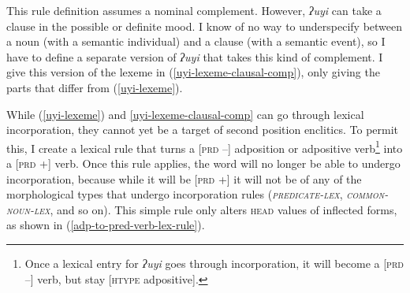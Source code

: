 This rule definition assumes a nominal complement. However, \textit{ʔuyi} can take a clause in the possible or definite mood. I know of no way to underspecify between a noun (with a semantic individual) and a clause (with a semantic event), so I have to define a separate version of \textit{ʔuyi} that takes this kind of complement. I give this version of the lexeme in (\ref{uyi-lexeme-clausal-comp}), only giving the parts that differ from (\ref{uyi-lexeme}).

\ex \label{uyi-lexeme-clausal-comp}
\xe

While (\ref{uyi-lexeme}) and \ref{uyi-lexeme-clausal-comp} can go through lexical incorporation, they cannot yet be a target of second position enclitics. To permit this, I create a lexical rule that turns a [\textsc{prd} --] adposition or adpositive verb\footnote{Once a lexical entry for \textit{ʔuyi} goes through incorporation, it will become a [\textsc{prd} --] verb, but stay [\textsc{htype} adpositive].} into a [\textsc{prd} +] verb. Once this rule applies, the word will no longer be able to undergo incorporation, because while it will be [\textsc{prd} +] it will not be of any of the morphological types that undergo incorporation rules (\textsc{\textit{predicate-lex}}, \textsc{\textit{common-noun-lex}}, and so on). This simple rule only alters \textsc{head} values of inflected forms, as shown in (\ref{adp-to-pred-verb-lex-rule}).

